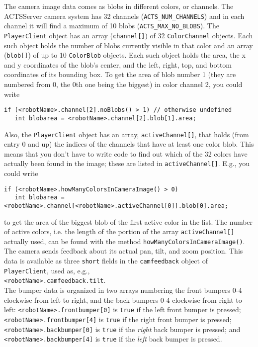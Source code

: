 \documentclass[11pt]{article}
\begin{document}
The camera image data comes as blobs in different colors, or channels. The ACTSServer camera system has 32 channels ({\tt ACTS\_NUM\_CHANNELS}) and in each channel it will find a maximum of 10 blobs ({\tt ACTS\_MAX\_NO\_BLOBS}). The {\tt PlayerClient} object has an array ({\tt channel[]}) of 32 {\tt ColorChannel} objects. Each such object holds the number of blobs currently visible in that color and an array ({\tt blob[]}) of up to 10 {\tt ColorBlob} objects. Each such object holds the area, the x and y coordinates of the blob's center, and the left, right, top, and bottom coordinates of its bounding box. To get the area of blob number 1 (they are numbered from 0, the 0th one being the biggest) in color channel 2, you could write
\begin{verbatim}
if (<robotName>.channel[2].noBlobs() > 1) // otherwise undefined
   int blobarea = <robotName>.channel[2].blob[1].area;
\end{verbatim}
Also, the {\tt PlayerClient} object has an array, {\tt activeChannel[]}, that holds (from entry 0 and up) the indices of the channels that have at least one color blob. This means that you don't have to write code to find out which of the 32 colors have actually been found in the image; these are listed in {\tt activeChannel[]}. E.g., you could write
\begin{verbatim}
if (<robotName>.howManyColorsInCameraImage() > 0)
   int blobarea = <robotName>.channel[<robotName>.activeChannel[0]].blob[0].area;
\end{verbatim}
 to get the area of the biggest blob of the first active color in the list. The number of active colors, i.e. the length of the portion of the array {\tt activeChannel[]} actually used, can be found with the method {\tt howManyColorsInCameraImage()}.\\
\newline
The camera sends feedback about its actual pan, tilt, and zoom position. This data is available as three {\tt short} fields in the {\tt camfeedback} object of {\tt PlayerClient}, used as, e.g.,\\
\newline
 {\tt <robotName>.camfeedback.tilt}.\\
\newline
The bumper data is organized in two arrays numbering the front bumpers 0-4 clockwise from left to right, and the back bumpers 0-4 clockwise from right to left: {\tt <robotName>.frontbumper[0]} is {\tt true} if the left front bumper is pressed; {\tt <robotName>.frontbumper[4]} is {\tt true} if the right front bumper is pressed; {\tt <robotName>.backbumper[0]} is {\tt true} if the {\em right} back bumper is pressed; and {\tt <robotName>.backbumper[4]} is {\tt true} if the {\em left} back bumper is pressed.
\end{document}
